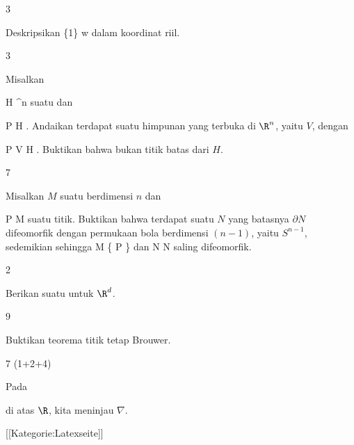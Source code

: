{3}
{

Deskripsikan
\maabbeledisp {\psi} { \Complex \setminus \{1\} } { \Complex
} {w} { {  }
} {}
dalam koordinat riil.

}
{} {}

{3}
{

Misalkan

\mavergleichskette
{\vergleichskette
{ H
}
{ \subseteq }{ \R^n
}
{  }{
}
{    }{
}
{   }{
}
}
{}{}{}
suatu
dan

\mavergleichskette
{\vergleichskette
{ P
}
{ \in }{ H
}
{  }{
}
{    }{
}
{   }{
}
}
{}{}{.}
Andaikan terdapat suatu himpunan yang terbuka di $\R^n$, yaitu $V$, dengan

\mavergleichskette
{\vergleichskette
{ P
}
{ \in }{ V
}
{ \subseteq }{ H
}
{    }{
}
{   }{
}
}
{}{}{.}
Buktikan bahwa
 bukan titik batas dari $H$.

}
{} {}

{7}
{

Misalkan $M$ suatu
berdimensi $n$ dan

\mavergleichskette
{\vergleichskette
{ P
}
{ \in }{ M
}
{  }{
}
{    }{
}
{   }{
}
}
{}{}{}
suatu titik. Buktikan bahwa terdapat suatu
$N$ yang batasnya $\partial N$ difeomorfik dengan permukaan bola berdimensi $(n-1)$, yaitu $S^{n-1}$, sedemikian sehingga
\mathkor {} {M \setminus \{ P \}} {dan} {N \setminus \partial N} {}
saling difeomorfik.

}
{} {}

{2}
{

Berikan suatu
untuk $\R^d$.

}
{} {}

{9}
{

Buktikan teorema titik tetap Brouwer.

}
{} {}

{7 (1+2+4)}
{

Pada

 di atas $\R$, kita meninjau
$\nabla$.

}
{} {}

 [[Kategorie:Latexseite]]
